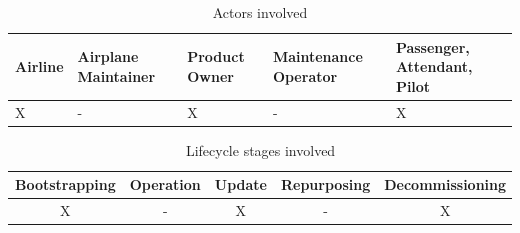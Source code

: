 \begin{table}
	\caption{Actors involved}
	\label{tab:Actors involved}
	\begin{center}
		\begin{tabular}{ |p{2.5cm}|p{2.5cm}|p{2.5cm}|p{2.5cm}|p{2.5cm}| }
			\hline
			Airline & Airplane Maintainer & Product Owner & Maintenance Operator & Passenger, Attendant, Pilot \\
			\hline
			X       & -                   & X             & -                    & X                           \\
			\hline
		\end{tabular}
	\end{center}
\end{table}

\begin{table}
	\caption{Lifecycle stages involved}
	\label{tab:Lifecycle stages involved}
	\begin{center}
		\begin{tabular}{ |c|c|c|c|c| }
			\hline
			Bootstrapping & Operation & Update & Repurposing & Decommissioning \\
			\hline
			X             & -         & X      & -           & X               \\
			\hline
		\end{tabular}
	\end{center}
\end{table}



